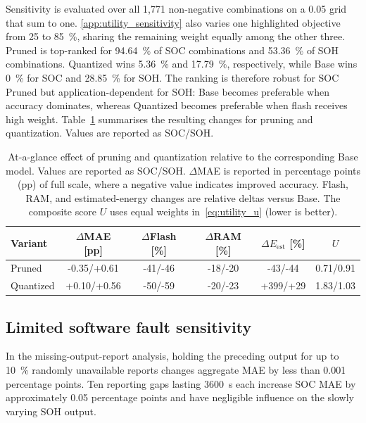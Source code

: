 \documentclass[final,3p,times]{elsarticle}
\begin{document}
Sensitivity is evaluated over all 1,771 non-negative combinations on a 0.05 grid that sum to one. \ref{app:utility_sensitivity} also varies one highlighted objective from 25 to 85~\%, sharing the remaining weight equally among the other three. Pruned is top-ranked for 94.64~\% of SOC combinations and 53.36~\% of SOH combinations. Quantized wins 5.36~\% and 17.79~\%, respectively, while Base wins 0~\% for SOC and 28.85~\% for SOH. The ranking is therefore robust for SOC Pruned but application-dependent for SOH: Base becomes preferable when accuracy dominates, whereas Quantized becomes preferable when flash receives high weight.
Table~\ref{tab:tradeoff_summary} summarises the resulting changes for pruning and quantization. Values are reported as SOC/SOH.
\begin{table}[tbp]
    \centering
    \caption[Summary of pruning/quantization effects]{At-a-glance effect of pruning and quantization relative to the corresponding Base model. Values are reported as SOC/SOH. $\Delta$MAE is reported in percentage points (pp) of full scale, where a negative value indicates improved accuracy. Flash, RAM, and estimated-energy changes are relative deltas versus Base. The composite score $U$ uses equal weights in~\eqref{eq:utility_u} (lower is better).}
    \label{tab:tradeoff_summary}
    \scriptsize
    \setlength{\tabcolsep}{2.5pt}
    \renewcommand{\arraystretch}{1.05}
    \begin{tabular}{lccccc}
        \toprule
        Variant & $\Delta$MAE [pp] & $\Delta$Flash [\%] & $\Delta$RAM [\%] & $\Delta E_{\mathrm{est}}$ [\%] & $U$ \\
        \midrule
        Pruned & \textcolor{mgGreen}{-0.35}/\textcolor{mgRed}{+0.61} & \textcolor{mgGreen}{-41}/\textcolor{mgGreen}{-46} & \textcolor{mgGreen}{-18}/\textcolor{mgGreen}{-20} & \textcolor{mgGreen}{-43}/\textcolor{mgGreen}{-44} & 0.71/0.91 \\
        Quantized & \textcolor{mgRed}{+0.10}/\textcolor{mgRed}{+0.56} & \textcolor{mgGreen}{-50}/\textcolor{mgGreen}{-59} & \textcolor{mgGreen}{-20}/\textcolor{mgGreen}{-23} & \textcolor{mgRed}{+399}/\textcolor{mgRed}{+29} & 1.83/1.03 \\
        \bottomrule
    \end{tabular}
\end{table}

\subsection{Limited software fault sensitivity}
In the missing-output-report analysis, holding the preceding output for up to 10~\% randomly unavailable reports changes aggregate MAE by less than 0.001 percentage points. Ten reporting gaps lasting 3600~s each increase SOC MAE by approximately 0.05 percentage points and have negligible influence on the slowly varying SOH output.
\end{document}
